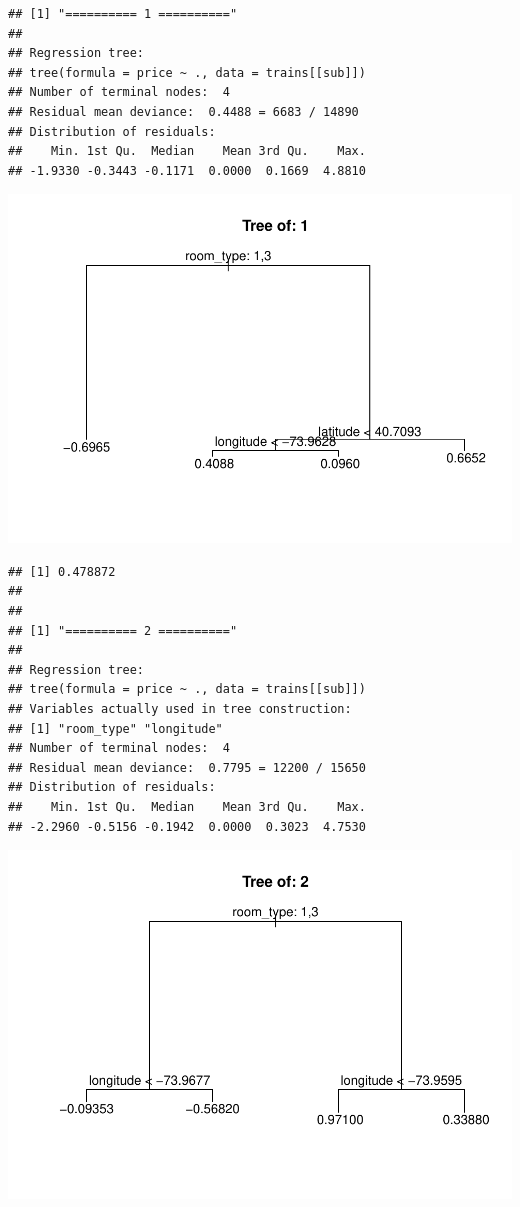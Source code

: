\documentclass[
]{article}
\begin{document}
\begin{verbatim}
## [1] "========== 1 =========="
## 
## Regression tree:
## tree(formula = price ~ ., data = trains[[sub]])
## Number of terminal nodes:  4 
## Residual mean deviance:  0.4488 = 6683 / 14890 
## Distribution of residuals:
##    Min. 1st Qu.  Median    Mean 3rd Qu.    Max. 
## -1.9330 -0.3443 -0.1171  0.0000  0.1669  4.8810
\end{verbatim}

\includegraphics{project-code_files/figure-latex/unnamed-chunk-14-1.pdf}

\begin{verbatim}
## [1] 0.478872
## 
## 
## [1] "========== 2 =========="
## 
## Regression tree:
## tree(formula = price ~ ., data = trains[[sub]])
## Variables actually used in tree construction:
## [1] "room_type" "longitude"
## Number of terminal nodes:  4 
## Residual mean deviance:  0.7795 = 12200 / 15650 
## Distribution of residuals:
##    Min. 1st Qu.  Median    Mean 3rd Qu.    Max. 
## -2.2960 -0.5156 -0.1942  0.0000  0.3023  4.7530
\end{verbatim}

\includegraphics{project-code_files/figure-latex/unnamed-chunk-14-2.pdf}
\end{document}
